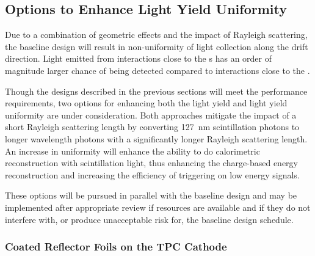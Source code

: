 
\subsection{Options to Enhance Light Yield Uniformity}
\label{sec:fdsp-pd-enh}

Due to a combination of geometric effects and the impact of Rayleigh scattering, the baseline   design will result in non-uniformity of light collection along the drift direction. Light emitted from interactions close to the s has an order of magnitude larger chance of being detected compared to interactions close to the .    

Though the designs described in the previous sections will meet the  performance requirements, %
two options for enhancing both the light yield and light yield uniformity are under consideration.  Both approaches mitigate the impact of a short Rayleigh scattering length by converting \SI{127}{nm} scintillation photons to longer wavelength photons with a significantly longer Rayleigh scattering length. %
An increase in uniformity %
will enhance the ability to do calorimetric reconstruction with scintillation light, %
thus enhancing the charge-based energy reconstruction %
and increasing the efficiency of triggering on low energy signals.

These options will be pursued in parallel with the baseline design and may be implemented after appropriate review if resources are available and if they do not interfere with, or produce unacceptable risk for, the baseline design schedule.



\subsubsection{Coated Reflector Foils on the TPC Cathode}
\label{sec:fdsp-pd-enh-cathode}

